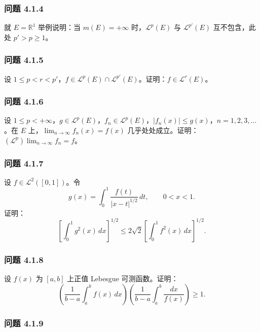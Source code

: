 \documentclass[11pt,a4paper]{article}
\begin{document}
\subsubsection{问题 4.1.4}\label{ch04-practice-ux95eeux9898-4.1.4}

就 \(E=\mathbb R^1\) 举例说明：当 \(m(E)=+\infty\)
时，\(\mathcal L^p(E)\) 与 \(\mathcal L^{p'}(E)\) 互不包含，此处
\(p'>p\ge1\)。

\subsubsection{问题 4.1.5}\label{ch04-practice-ux95eeux9898-4.1.5}

设
\(1\le p<r<p'\)，\(f\in\mathcal L^p(E)\cap\mathcal L^{p'}(E)\)。证明：\(f\in\mathcal L^r(E)\)。

\subsubsection{问题 4.1.6}\label{ch04-practice-ux95eeux9898-4.1.6}

设
\(1\le p<+\infty\)，\(g\in\mathcal L^p(E)\)，\(f_n\in\mathcal L^p(E)\)，\(|f_n(x)|\le g(x)\)，\(n=1,2,3,\ldots\)。在
\(E\) 上，\(\lim_{n\to\infty}f_n(x)=f(x)\)
几乎处处成立。证明：\((\mathcal L^p)\lim_{n\to\infty}f_n=f\)。

\subsubsection{问题 4.1.7}\label{ch04-practice-ux95eeux9898-4.1.7}

设 \(f\in\mathcal L^2([0,1])\)。令 \[
g(x)=\int_0^1\frac{f(t)}{|x-t|^{1/2}}\,dt,\qquad0<x<1.
\] 证明： \[
\left[\int_0^1g^2(x)\,dx\right]^{1/2}\le2\sqrt2\left[\int_0^1f^2(x)\,dx\right]^{1/2}.
\]

\subsubsection{问题 4.1.8}\label{ch04-practice-ux95eeux9898-4.1.8}

设 \(f(x)\) 为 \([a,b]\) 上正值 Lebesgue 可测函数。证明： \[
\left(\frac1{b-a}\int_a^bf(x)\,dx\right)
\left(\frac1{b-a}\int_a^b\frac{dx}{f(x)}\right)\ge1.
\]

\subsubsection{问题 4.1.9}\label{ch04-practice-ux95eeux9898-4.1.9}
\end{document}
